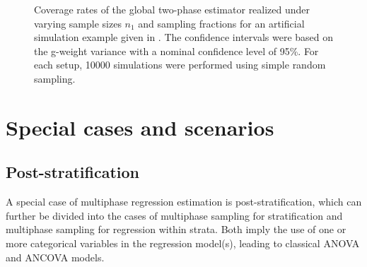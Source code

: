 \documentclass[article]{jss}
\begin{document}
\begin{figure}[h]
\centering
{}
\caption{Coverage rates of the global two-phase estimator realized under varying sample sizes $n_1$ and sampling fractions for an artificial simulation example given in \citet{mandallaz2013a}. The confidence intervals were based on the g-weight variance with a nominal confidence level of 95\%. For each setup, 10000 simulations were performed using simple random sampling.}
\label{fig:covrate_sim}
\end{figure}

\newpage




\section{Special cases and scenarios}
\label{sec:speccas_and_scen}

\subsection{Post-stratification}

A special case of multiphase regression estimation is post-stratification, which can further be divided into the cases of multiphase sampling for stratification and multiphase sampling for regression within strata. Both imply the use of one or more categorical variables in the regression model(s), leading to classical ANOVA and ANCOVA models.
\end{document}
